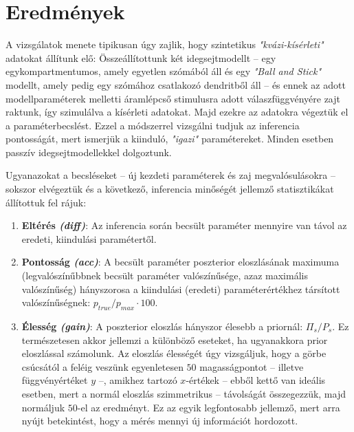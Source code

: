 \section{Eredmények}
A vizsgálatok menete tipikusan úgy zajlik, hogy szintetikus \textit{"kvázi-kísérleti"} adatokat állítunk elő: Összeállítottunk két idegsejtmodellt -- egy egykompartmentumos, amely egyetlen szómából áll és egy \textit{"Ball and Stick"} modellt, amely pedig egy szómához csatlakozó dendritből áll -- és ennek az adott modellparaméterek melletti áramlépcső stimulusra adott válaszfüggvényére zajt  raktunk, így szimulálva a kísérleti adatokat. Majd ezekre az adatokra végeztük el a paraméterbecslést. Ezzel a módszerrel vizsgálni tudjuk az inferencia pontosságát, mert ismerjük a kiinduló, \textit{"igazi"} paramétereket. Minden esetben passzív idegsejtmodellekkel dolgoztunk.

Ugyanazokat a becsléseket -- új kezdeti paraméterek és zaj megvalósulásokra -- sokszor elvégeztük és a következő, inferencia minőségét jellemző statisztikákat állítottuk fel rájuk:
\begin{enumerate}
	\item \textbf{Eltérés \textit{(diff)}}: Az inferencia során becsült paraméter mennyire van távol az eredeti, kiindulási paramétertől.
	\item \textbf{Pontosság \textit{(acc)}}: A becsült paraméter poszterior eloszlásának maximuma (legvalószínűbbnek becsült paraméter valószínűsége, azaz maximális valószínűség) hányszorosa a kiindulási (eredeti) paraméterértékhez társított valószínűségnek: $p_{true}/p_{max}\cdot 100$.
	\item \textbf{Élesség \textit{(gain)}}: A poszterior eloszlás hányszor élesebb a priornál: $\Pi_{s}/P_s$. Ez természetesen akkor jellemzi a különböző eseteket, ha ugyanakkora prior eloszlással számolunk. Az eloszlás élességét úgy vizsgáljuk, hogy a görbe csúcsától a feléig veszünk egyenletesen $50$ magasságpontot -- illetve függvényértéket $y$ --, amikhez tartozó $x$-értékek -- ebből kettő van ideális esetben, mert a normál eloszlás szimmetrikus -- távolságát összegezzük, majd normáljuk $50$-el az eredményt.
	Ez az egyik legfontosabb jellemző, mert arra nyújt betekintést, hogy a mérés mennyi új információt hordozott.
\end{enumerate}

